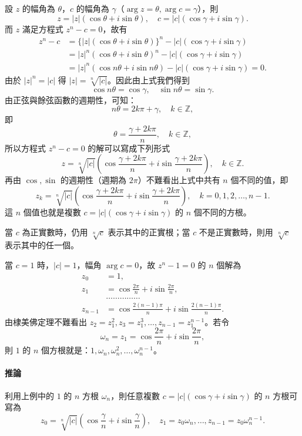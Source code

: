設 $z$ 的幅角為 $\theta$，$c$ 的幅角為 $\gamma$（$\arg z = \theta, \arg c = \gamma$），則
\[
z = |z|(\cos\theta+i\sin\theta), \quad c = |c|(\cos\gamma+i\sin\gamma).
\]
而 $z$ 滿足方程式 $z^n-c=0$，故有
\begin{align*}
z^n-c &= \{|z|(\cos\theta+i\sin\theta)\}^n - |c|(\cos\gamma+i\sin\gamma) \\
&= |z|^n(\cos\theta+i\sin\theta)^n - |c|(\cos\gamma+i\sin\gamma) \\
&= |z|^n(\cos n\theta+i\sin n\theta) - |c|(\cos\gamma+i\sin\gamma) = 0.
\end{align*}
由於 $|z|^n = |c|$ 得 $|z| = \sqrt[n]{|c|}$。因此由上式我們得到
\[
\cos n\theta = \cos\gamma, \quad \sin n\theta = \sin\gamma.
\]
由正弦與餘弦函數的週期性，可知：
\[
n\theta = 2k\pi+\gamma, \quad k \in \mathbb{Z},
\]
即
\[
\theta = \frac{\gamma+2k\pi}{n}, \quad k \in \mathbb{Z},
\]
所以方程式 $z^n-c=0$ 的解可以寫成下列形式
\[
z = \sqrt[n]{|c|}\left(\cos\frac{\gamma+2k\pi}{n} + i\sin\frac{\gamma+2k\pi}{n}\right), \quad k \in \mathbb{Z}.
\]
再由 $\cos, \sin$ 的週期性（週期為 $2\pi$）不難看出上式中共有 $n$ 個不同的值，即
\[
z_k = \sqrt[n]{|c|}\left(\cos\frac{\gamma+2k\pi}{n} + i\sin\frac{\gamma+2k\pi}{n}\right), \quad k=0, 1, 2, \dots, n-1.
\]
這 $n$ 個值也就是複數 $c=|c|(\cos\gamma+i\sin\gamma)$ 的 $n$ 個不同的方根。

當 $c$ 為正實數時，仍用 $\sqrt[n]{c}$ 表示其中的正實根；當 $c$ 不是正實數時，則用 $\sqrt[n]{c}$ 表示其中的任一個。

\begin{discussion}
當 $c=1$ 時，$|c|=1$，幅角 $\arg c = 0$，故 $z^n-1=0$ 的 $n$ 個解為
\begin{align*}
z_0 &= 1, \\
z_1 &= \cos\frac{2\pi}{n}+i\sin\frac{2\pi}{n}, \\
&\dots\dots\dots\dots\dots \\
z_{n-1} &= \cos\frac{2(n-1)\pi}{n}+i\sin\frac{2(n-1)\pi}{n}.
\end{align*}
由棣美佛定理不難看出 $z_2 = z_1^2, z_3 = z_1^3, \dots, z_{n-1} = z_1^{n-1}$。若令
\[
\omega_n = z_1 = \cos\frac{2\pi}{n}+i\sin\frac{2\pi}{n},
\]
則 $1$ 的 $n$ 個方根就是：$1, \omega_n, \omega_n^2, \dots, \omega_n^{n-1}$。 \qedhere
\end{discussion}

\paragraph{推論} 利用上例中的 $1$ 的 $n$ 方根 $\omega_n$，則任意複數 $c=|c|(\cos\gamma+i\sin\gamma)$ 的 $n$ 方根可寫為
\[
z_0 = \sqrt[n]{|c|}\left(\cos\frac{\gamma}{n}+i\sin\frac{\gamma}{n}\right), \quad z_1 = z_0\omega_n, \dots, z_{n-1} = z_0\omega_n^{n-1}.
\]

